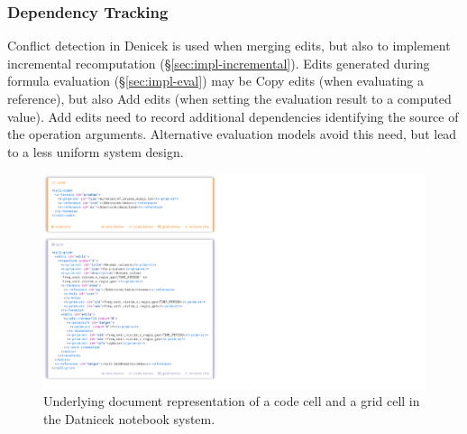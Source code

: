 \documentclass[sigconf,anonymous,screen]{acmart}
\newcommand{\ident}[1]{{\sffamily #1}}
\begin{document}
\subsubsection*{Dependency Tracking}
Conflict detection in Denicek is used when merging edits, but also to implement
incremental recomputation (\S\ref{sec:impl-incremental}). Edits generated during formula evaluation
(\S\ref{sec:impl-eval}) may be \ident{Copy} edits (when evaluating a reference), but also
\ident{Add} edits (when setting the evaluation result to a computed value). \ident{Add} edits
need to record additional dependencies identifying the source of the operation arguments.
Alternative evaluation models avoid this need, but lead to a less uniform system design.

%



\begin{figure}[t]
\vspace{-0.25em}
\includegraphics[width=0.9\columnwidth,clip,trim=0cm 0.7cm 18.5cm 0.2cm]{fig/source.pdf}
\vspace{-0.5em}
\caption{Underlying document representation of a code cell and a grid cell in the Datnicek
notebook system.}
\label{fig:source}
\vspace{-0.25em}
\end{figure}
\end{document}
